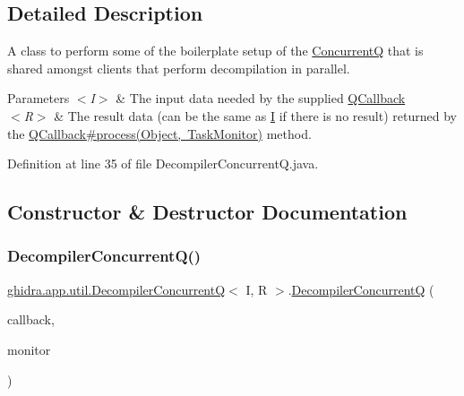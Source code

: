 \subsection{Detailed Description}
A class to perform some of the boilerplate setup of the \mbox{\hyperlink{}{ConcurrentQ}} that is shared amongst clients that perform decompilation in parallel.


\begin{DoxyParams}{Parameters}
{\em $<$\+I$>$} & The input data needed by the supplied \mbox{\hyperlink{}{Q\+Callback}} \\
\hline
{\em $<$\+R$>$} & The result data (can be the same as \mbox{\hyperlink{}{I}} if there is no result) returned by the \mbox{\hyperlink{}{Q\+Callback\#process(\+Object, Task\+Monitor)}} method. \\
\hline
\end{DoxyParams}


Definition at line 35 of file Decompiler\+Concurrent\+Q.\+java.



\subsection{Constructor \& Destructor Documentation}
\mbox{\label{classghidra_1_1app_1_1util_1_1_decompiler_concurrent_q_a9e54e7889d280a864599fe641781565c}} 
\subsubsection{\texorpdfstring{DecompilerConcurrentQ()}{DecompilerConcurrentQ()}\hspace{0.1cm}{\footnotesize\ttfamily [1/2]}}
{\footnotesize\ttfamily \mbox{\hyperlink{classghidra_1_1app_1_1util_1_1_decompiler_concurrent_q}{ghidra.\+app.\+util.\+Decompiler\+ConcurrentQ}}$<$ I, R $>$.\mbox{\hyperlink{classghidra_1_1app_1_1util_1_1_decompiler_concurrent_q}{Decompiler\+ConcurrentQ}} (\begin{DoxyParamCaption}\item[{Q\+Callback$<$ I, R $>$}]{callback,  }\item[{Task\+Monitor}]{monitor }\end{DoxyParamCaption})\hspace{0.3cm}{\ttfamily [inline]}}



